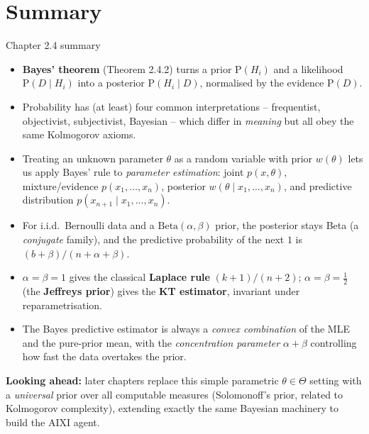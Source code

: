 \documentclass[aspectratio=169,10pt]{beamer}
\begin{document}
\section{Summary}

\begin{frame}{Chapter 2.4 summary}
  \begin{itemize}
    \item \textbf{Bayes' theorem} (Theorem 2.4.2) turns a prior
      $\mathrm P(H_i)$ and a likelihood $\mathrm P(D\mid H_i)$ into a
      posterior $\mathrm P(H_i\mid D)$, normalised by the evidence
      $\mathrm P(D)$.
    \item Probability has (at least) four common interpretations --
      frequentist, objectivist, subjectivist, Bayesian -- which differ in
      \emph{meaning} but all obey the same Kolmogorov axioms.
    \item Treating an unknown parameter $\theta$ as a random variable with
      prior $w(\theta)$ lets us apply Bayes' rule to \emph{parameter
      estimation}: joint $p(x,\theta)$, mixture/evidence
      $p(x_1,\ldots,x_n)$, posterior $w(\theta\mid x_1,\ldots,x_n)$, and
      predictive distribution $p(x_{n+1}\mid x_1,\ldots,x_n)$.
    \item For i.i.d.\ Bernoulli data and a $\mathrm{Beta}(\alpha,\beta)$
      prior, the posterior stays Beta (a \emph{conjugate} family), and the
      predictive probability of the next $1$ is
      $(b+\beta)/(n+\alpha+\beta)$.
    \item $\alpha=\beta=1$ gives the classical \textbf{Laplace rule}
      $(k+1)/(n+2)$; $\alpha=\beta=\tfrac12$ (the \textbf{Jeffreys prior})
      gives the \textbf{KT estimator}, invariant under reparametrisation.
    \item The Bayes predictive estimator is always a \emph{convex
      combination} of the MLE and the pure-prior mean, with the
      \emph{concentration parameter} $\alpha+\beta$ controlling how fast
      the data overtakes the prior.
  \end{itemize}
  \vspace{0.2cm}
  \textbf{Looking ahead:} later chapters replace this simple parametric
  $\theta\in\Theta$ setting with a \emph{universal} prior over all
  computable measures (Solomonoff's prior, related to Kolmogorov
  complexity), extending exactly the same Bayesian machinery to build the
  AIXI agent.
\end{frame}
\end{document}
